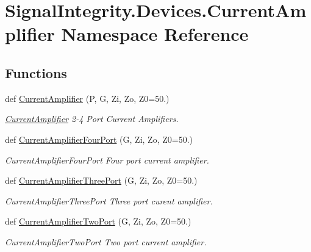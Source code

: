 \hypertarget{namespaceSignalIntegrity_1_1Devices_1_1CurrentAmplifier}{}\section{Signal\+Integrity.\+Devices.\+Current\+Amplifier Namespace Reference}
\label{namespaceSignalIntegrity_1_1Devices_1_1CurrentAmplifier}
\subsection*{Functions}
\begin{DoxyCompactItemize}
\item 
def \hyperlink{namespaceSignalIntegrity_1_1Devices_1_1CurrentAmplifier_a207696af6011d62d2e67b021e95f66a4}{Current\+Amplifier} (P, G, Zi, Zo, Z0=50.)
\begin{DoxyCompactList}\small\item\em \hyperlink{namespaceSignalIntegrity_1_1Devices_1_1CurrentAmplifier}{Current\+Amplifier} 2-\/4 Port Current Amplifiers. \end{DoxyCompactList}\item 
def \hyperlink{namespaceSignalIntegrity_1_1Devices_1_1CurrentAmplifier_aeef0a27262654397800403fb7e8cac2e}{Current\+Amplifier\+Four\+Port} (G, Zi, Zo, Z0=50.)
\begin{DoxyCompactList}\small\item\em Current\+Amplifier\+Four\+Port Four port current amplifier. \end{DoxyCompactList}\item 
def \hyperlink{namespaceSignalIntegrity_1_1Devices_1_1CurrentAmplifier_a8def01ecc130919dc8d0120151315d19}{Current\+Amplifier\+Three\+Port} (G, Zi, Zo, Z0=50.)
\begin{DoxyCompactList}\small\item\em Current\+Amplifier\+Three\+Port Three port curent amplifier. \end{DoxyCompactList}\item 
def \hyperlink{namespaceSignalIntegrity_1_1Devices_1_1CurrentAmplifier_ae448d62ce2959c67785dd98bc24054e1}{Current\+Amplifier\+Two\+Port} (G, Zi, Zo, Z0=50.)
\begin{DoxyCompactList}\small\item\em Current\+Amplifier\+Two\+Port Two port current amplifier. \end{DoxyCompactList}\end{DoxyCompactItemize}


